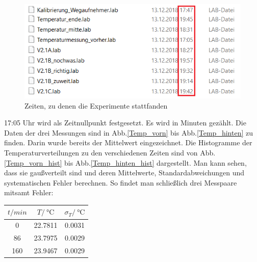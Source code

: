 \documentclass[]{article}
\begin{document}
	\begin{figure}
		\begin{center}
			\includegraphics[scale=0.9]{Images/Messreihenendzeiten.png}
			\caption{Zeiten, zu denen die Experimente stattfanden}
			\label{Temp_Zeiten}
		\end{center}
	\end{figure}
	17:05 Uhr wird als Zeitnullpunkt festgesetzt. Es wird in Minuten gezählt. Die Daten der drei Messungen sind in Abb.\ref{Temp_vorn} bis Abb.\ref{Temp_hinten} zu finden. Darin wurde bereits der Mittelwert eingezeichnet. Die Histogramme der Temperaturverteilungen zu den verschiedenen Zeiten sind von Abb.\ref{Temp_vorn_hist}
 	bis Abb.\ref{Temp_hinten_hist} dargestellt. Man kann sehen, dass sie gaußverteilt sind und deren Mittelwerte, Standardabweichungen und systematischen Fehler berechnen. So findet man schließlich drei Messpaare mitsamt Fehler:
 	
 	\begin{center}
 	\begin{tabular}{c|c|c}
 		$t/min$ & $T/\SI{}{\celsius}$ & $\sigma_T/\SI{}{\celsius}$\\
 		\hline
 		0 & 22.7811 & 0.0031\\
 		\hline 
 		86 & 23.7975 & 0.0029\\
 		\hline
 		160 & 23.9467 & 0.0029\\
 	\end{tabular}
 	\end{center}
 	
\end{document}
